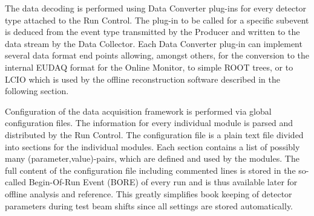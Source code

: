 The data decoding is performed using Data Converter plug-ins for every detector type attached to the Run Control. 
The plug-in to be called for a specific subevent is deduced from the event type transmitted by the Producer and written to the data stream by the Data Collector. 
Each Data Converter plug-in can implement several data format end points allowing, amongst others, for the conversion to the internal EUDAQ format for the Online Monitor, to simple ROOT trees, or to LCIO
 which is used by the offline reconstruction software described in the following section.

Configuration of the data acquisition framework is performed via global configuration files. 
The information for every individual module is parsed and distributed by the Run Control. 
The configuration file is a plain text file divided into sections for the individual modules. 
Each section contains a list of possibly many (parameter,value)-pairs, which are defined and used by the modules.
The full content of the configuration file including commented lines is stored in the so-called Begin-Of-Run Event (BORE) of every run and is thus available later for offline analysis and reference. 
This greatly simplifies book keeping of detector parameters during test beam shifts since all settings are stored automatically.
